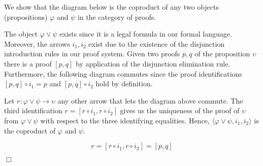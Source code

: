 
We show that the diagram below is the coproduct of any two objects (propositions) $φ$ and $ψ$ in the category of proofs.


The object $φ ∨ ψ$ exists since it is a legal formula in our formal language. Moreover, the arrows $i_1, i_2$ exist due to the existence of the disjunction introduction rules in our proof system. Given two proofs $p, q$ of the proposition $υ$ there is a proof $[p,q]$ by application of the disjunction elimination rule. Furthermore, the following diagram commutes since the proof identifications $[p,q] ∘ i_1 = p$ and $[p,q] ∘ i_2$ hold by definition.


Let $r : φ ∨ ψ → υ$ any other arrow that lets the diagram above commute. The third identification $r = [r ∘ i_1,r ∘ i_2]$ gives us the uniqueness of the proof of $υ$ from $φ ∨ ψ$ with respect to the three identifying equalities. Hence, $⟨φ ∨ ψ,i_1,i_2⟩$ is the coproduct of $φ$ and $ψ$.

$$r = [r ∘ i_1,r ∘ i_2] = [p,q]$$

\hfill $\Box$

